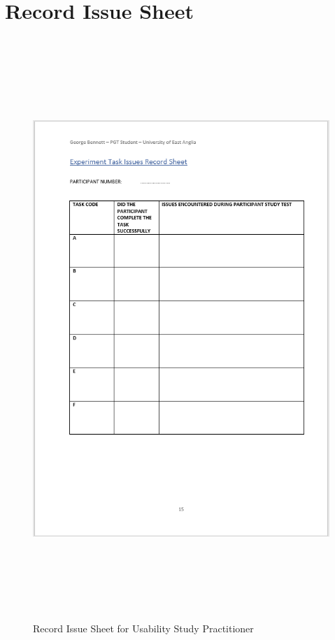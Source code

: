\section{Record Issue Sheet}
\begin{figure}[H]
\includegraphics[width=16cm,height=22cm]{Screenshots/StudyMaterialScreenshots/issuesEncounteredinStudy.png}
\caption{Record Issue Sheet for Usability Study Practitioner}
\end{figure}

